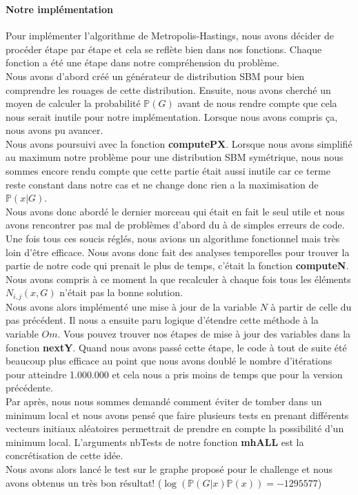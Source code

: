 \subsubsection*{}
\paragraph*{Notre implémentation}
Pour implémenter l'algorithme de Metropolis-Hastings, nous avons décider de 
procéder étape par étape et cela se reflète bien dans nos fonctions. Chaque 
fonction a été une étape dans notre compréhension du problème. \\
Nous avons d'abord créé un générateur de distribution SBM pour bien comprendre les 
rouages de cette distribution. Ensuite, nous avons cherché un moyen de calculer
la probabilité $\mathbb{P}(G)$ avant de nous rendre compte que cela nous serait inutile 
pour notre implémentation. Lorsque nous avons compris ça, nous avons pu avancer.\\
Nous avons poursuivi avec la fonction \textbf{computePX}. Lorsque nous avons simplifié au maximum 
notre problème pour une distribution SBM symétrique, nous nous sommes encore rendu compte
que cette partie était aussi inutile car ce terme reste constant dans notre cas et ne change 
donc rien a la maximisation de $\mathbb{P}(x|G)$. \\
Nous avons donc abordé le dernier morceau qui était en fait le seul utile et 
nous avons rencontrer pas mal de problèmes d'abord du à de simples erreurs de code. \\
Une fois tous ces soucis réglés, nous avions un algorithme fonctionnel mais 
très loin d'être efficace. Nous avons donc fait des analyses temporelles pour trouver la partie 
de notre code qui prenait le plus de temps, c'était la fonction \textbf{computeN}. Nous avons compris
à ce moment la que recalculer à chaque fois tous les éléments $N_{i,j}(x,G)$ n'était pas la bonne 
solution. \\
Nous avons alors implémenté une mise à jour de la variable $N$ à partir de celle du pas
précédent. Il nous a ensuite paru logique d'étendre cette méthode à la variable $Om$. Vous pouvez 
trouver nos étapes de mise à jour des variables dans la fonction \textbf{nextY}. Quand nous avons
passé cette étape, le code à tout de suite été beaucoup plus efficace au point que nous avons doublé
le nombre d'itérations pour atteindre 1.000.000 et cela nous a pris moins de temps que pour la  version précédente.\\
Par après, nous nous sommes demandé comment 
éviter de tomber dans un minimum local et nous avons pensé que faire plusieurs tests en prenant 
différents vecteurs initiaux aléatoires permettrait de prendre en compte la possibilité d'un minimum local.
L'arguments nbTests de notre fonction \textbf{mhALL} est la concrétisation de cette idée.\\
Nous avons alors lancé le test sur le graphe proposé pour le challenge et nous avons obtenus un très 
bon résultat! ($\log(\mathbb{P}(G|x)\mathbb{P}(x)) = -1295577$)
